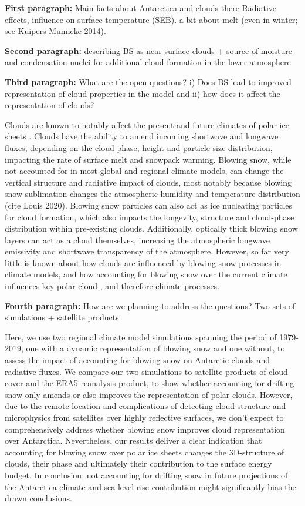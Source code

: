 \documentclass[12pt]{article}
\begin{document}
\textbf{First paragraph:} Main facts about Antarctica and clouds there
Radiative effects, influence on surface temperature (SEB). a bit about melt (even in winter; see Kuipers-Munneke 2014).

\textbf{Second paragraph:} describing BS as near-surface clouds + source of moisture and condensation nuclei for additional cloud formation in the lower atmosphere

\textbf{Third paragraph:} What are the open questions? 
i) Does BS lead to improved representation of cloud properties in the model and ii) how does it affect the representation of clouds?

Clouds are known to notably affect the present and future climates of polar ice sheets \cite{Hofer2017, Hofer2019, VanTricht2016, Izeboud2020, Hahn2019}. Clouds have the ability to amend incoming shortwave and longwave fluxes, depending on the cloud phase, height and particle size distribution, impacting the rate of surface melt and snowpack warming. Blowing snow, while not accounted for in most global and regional climate models, can change the vertical structure and radiative impact of clouds, most notably because blowing snow sublimation changes the atmospheric humidity and temperature distribution (cite Louis 2020). Blowing snow particles can also act as ice nucleating particles for cloud formation, which also impacts the longevity, structure and cloud-phase distribution within pre-existing clouds. Additionally, optically thick blowing snow layers can act as a cloud themselves, increasing the atmospheric longwave emissivity and shortwave transparency of the atmosphere. However, so far very little is known about how clouds are influenced by blowing snow processes in climate models, and how accounting for blowing snow over the current climate influences key polar cloud-, and therefore climate processes.

\textbf{Fourth paragraph:} How are we planning to address the questions? 
Two sets of simulations + satellite products

Here, we use two regional climate model simulations spanning the period of 1979-2019, one with a dynamic representation of blowing snow and one without, to assess the impact of accounting for blowing snow on Antarctic clouds and radiative fluxes. We compare our two simulations to satellite products of cloud cover and the ERA5 reanalysis product, to show whether accounting for drifting snow only amends or also improves the representation of polar clouds. However, due to the remote location and complications of detecting cloud structure and microphysics from satellites over highly reflective surfaces, we don’t expect to comprehensively address whether blowing snow improves cloud representation over Antarctica. Nevertheless, our results deliver a clear indication that accounting for blowing snow over polar ice sheets changes the 3D-structure of clouds, their phase and ultimately their contribution to the surface energy budget. In conclusion, not accounting for drifting snow in future projections of the Antarctica climate and sea level rise contribution might significantly bias the drawn conclusions.  
\end{document}
